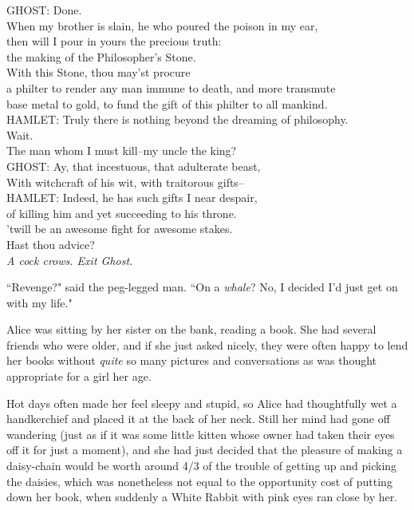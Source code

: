 \begin{playdialog}
GHOST: Done.\\
When my brother is slain, he who poured the poison in my ear,\\
then will I pour in yours the precious truth:\\
the making of the Philosopher's Stone.\\
With this Stone, thou may'st procure\\
a philter to render any man immune to death, and more transmute\\
base metal to gold, to fund the gift of this philter to all mankind.\\

HAMLET: Truly there is nothing beyond the dreaming of philosophy.\\
Wait.\\
The man whom I must kill\---my uncle the king?\\

GHOST: Ay, that incestuous, that adulterate beast,\\
With witchcraft of his wit, with traitorous gifts\---\\

HAMLET: Indeed, he has such gifts I near despair,\\
of killing him and yet succeeding to his throne.\\
'twill be an awesome fight for awesome stakes.\\
Hast thou advice?\\

\emph{A cock crows. Exit Ghost.}
\end{playdialog}


``Revenge?" said the peg-legged man. ``On a \emph{whale}? No, I decided I'd just get on with my life."


Alice was sitting by her sister on the bank, reading a book. She had several friends who were older, and if she just asked nicely, they were often happy to lend her books without \emph{quite} so many pictures and conversations as was thought appropriate for a girl her age.

Hot days often made her feel sleepy and stupid, so Alice had thoughtfully wet a handkerchief and placed it at the back of her neck. Still her mind had gone off wandering (just as if it was some little kitten whose owner had taken their eyes off it for just a moment), and she had just decided that the pleasure of making a daisy-chain would be worth around 4/3 of the trouble of getting up and picking the daisies, which was nonetheless not equal to the opportunity cost of putting down her book, when suddenly a White Rabbit with pink eyes ran close by her.

